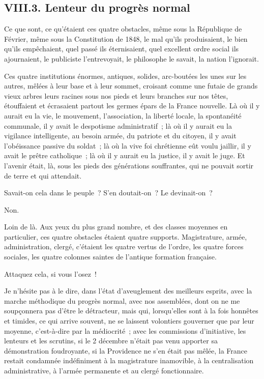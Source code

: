 \documentclass[french,twoside]{book} %
\begin{document}
\subsection[{VIII.3. Lenteur du progrès normal}]{VIII.3. Lenteur du progrès normal}
\noindent Ce que sont, ce qu’étaient ces quatre obstacles, même sous la République de Février, même sous la Constitution de 1848, le mal qu’ils produisaient, le bien qu’ils empêchaient, quel passé ils éternisaient, quel excellent ordre social ils ajournaient, le publiciste l’entrevoyait, le philosophe le savait, la nation l’ignorait.\par
Ces quatre institutions énormes, antiques, solides, arc-boutées les unes sur les autres, mêlées à leur base et à leur sommet, croisant comme une futaie de grands vieux arbres leurs racines sous nos pieds et leurs branches sur nos têtes, étouffaient et écrasaient partout les germes épars de la France nouvelle. Là où il y aurait eu la vie, le mouvement, l’association, la liberté locale, la spontanéité communale, il y avait le despotisme administratif ; là où il y aurait eu la vigilance intelligente, au besoin armée, du patriote et du citoyen, il y avait l’obéissance passive du soldat ; là où la vive foi chrétienne eût voulu jaillir, il y avait le prêtre catholique ; là où il y aurait eu la justice, il y avait le juge. Et l’avenir était, là, sous les pieds des générations souffrantes, qui ne pouvait sortir de terre et qui attendait.\par
Savait-on cela dans le peuple ? S’en doutait-on ? Le devinait-on ?\par
Non.\par
Loin de là. Aux yeux du plus grand nombre, et des classes moyennes en particulier, ces quatre obstacles étaient quatre supports. Magistrature, armée, administration, clergé, c’étaient les quatre vertus de l’ordre, les quatre forces sociales, les quatre colonnes saintes de l’antique formation française.\par
Attaquez cela, si vous l’osez !\par
Je n’hésite pas à le dire, dans l’état d’aveuglement des meilleurs esprits, avec la marche méthodique du progrès normal, avec nos assemblées, dont on ne me soupçonnera pas d’être le détracteur, mais qui, lorsqu’elles sont à la fois honnêtes et timides, ce qui arrive souvent, ne se laissent volontiers gouverner que par leur moyenne, c’est-à-dire par la médiocrité ; avec les commissions d’initiative, les lenteurs et les scrutins, si le 2 décembre n’était pas venu apporter sa démonstration foudroyante, si la Providence ne s’en était pas mêlée, la France restait condamnée indéfiniment à la magistrature inamovible, à la centralisation administrative, à l’armée permanente et au clergé fonctionnaire.\par
\end{document}

